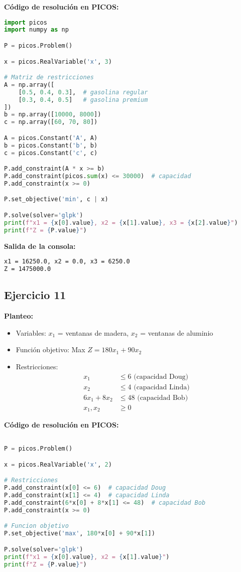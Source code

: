 \documentclass[12pt]{article}
\begin{document}
\textbf{Código de resolución en PICOS:}
\begin{lstlisting}[language=Python]
import picos
import numpy as np

P = picos.Problem()

x = picos.RealVariable('x', 3)

# Matriz de restricciones
A = np.array([
    [0.5, 0.4, 0.3],  # gasolina regular
    [0.3, 0.4, 0.5]   # gasolina premium
])
b = np.array([10000, 8000])
c = np.array([60, 70, 80])

A = picos.Constant('A', A)
b = picos.Constant('b', b)
c = picos.Constant('c', c)

P.add_constraint(A * x >= b)
P.add_constraint(picos.sum(x) <= 30000)  # capacidad
P.add_constraint(x >= 0)

P.set_objective('min', c | x)

P.solve(solver='glpk')
print(f"x1 = {x[0].value}, x2 = {x[1].value}, x3 = {x[2].value}")
print(f"Z = {P.value}")
\end{lstlisting}

\textbf{Salida de la consola:}
\begin{lstlisting}[language=bash,backgroundcolor=\color{black},basicstyle=\color{white}\ttfamily,numbers=none]
x1 = 16250.0, x2 = 0.0, x3 = 6250.0
Z = 1475000.0
\end{lstlisting}

\subsection{Ejercicio 11}

\textbf{Planteo:}
\begin{itemize}
\item Variables: $x_1$ = ventanas de madera, $x_2$ = ventanas de aluminio
\item Función objetivo: Max $Z = 180x_1 + 90x_2$
\item Restricciones:
  \begin{align*}
  x_1 &\leq 6 \text{ (capacidad Doug)} \\
  x_2 &\leq 4 \text{ (capacidad Linda)} \\
  6x_1 + 8x_2 &\leq 48 \text{ (capacidad Bob)} \\
  x_1, x_2 &\geq 0
  \end{align*}
\end{itemize}

\textbf{Código de resolución en PICOS:}
\begin{lstlisting}[language=Python]

P = picos.Problem()

x = picos.RealVariable('x', 2)

# Restricciones
P.add_constraint(x[0] <= 6)  # capacidad Doug
P.add_constraint(x[1] <= 4)  # capacidad Linda
P.add_constraint(6*x[0] + 8*x[1] <= 48)  # capacidad Bob
P.add_constraint(x >= 0)

# Funcion objetivo
P.set_objective('max', 180*x[0] + 90*x[1])

P.solve(solver='glpk')
print(f"x1 = {x[0].value}, x2 = {x[1].value}")
print(f"Z = {P.value}")
\end{lstlisting}
\end{document}
